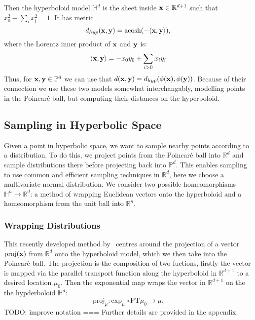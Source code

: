 \documentclass[11pt, twocolumn]{article}
\begin{document}
Then the hyperboloid model $\mathbb{H}^d$ is the sheet inside $\bold{x}\in\mathbb{R}^{d+1}$ such that $x_{0}^{2} - \sum_{i} x_{i}^{2} = 1$.
It has metric
\begin{equation}
    d_{hyp}(\bold{x}, \bold{y}) = \text{acosh}(-\langle \bold{x}, \bold{y} \rangle),
\end{equation}
where the Lorentz inner product of $\bold{x}$ and $\bold{y}$ is:
\begin{equation*}
	\langle \bold{x}, \bold{y} \rangle = -x_{0}y_{0} + \sum_{i>0} x_{i}y_{i}
\end{equation*}
Thus, for $\bold{x}, \bold{y} \in \mathbb{P}^{d}$ we can use that $d(\bold{x}, \bold{y}) = d_{hyp}(\phi(\bold{x}), \phi(\bold{y}))$.
Because of their connection we use these two models somewhat interchangably, modelling points in the Poincaré ball, but computing their distances on the hyperboloid.

\subsection{Sampling in Hyperbolic Space}
Given a point in hyperbolic space, we want to sample nearby points according to a distribution.
To do this, we project points from the Poincaré ball into $\mathbb{R}^d$ and sample distributions there before projecting back into $\mathbb{P}^d$.
This enables sampling to use common and efficient sampling techniques in $\mathbb{R}^d$, here we choose a multivariate normal distribution.
We consider two possible homeomorphisms $\mathbb{H}^n \to \mathbb{R}^d$: a method of wrapping Euclidean vectors onto the hyperboloid and a homeomorphism from the unit ball into $\mathbb{R}^n$.

\subsubsection{Wrapping Distributions}
This recently developed method by~\cite{nagano2019wrapped} centres around the projection of a vector $\text{proj}(\bold{x})$ from $\mathbb{R}^d$ onto the hyperboloid model, which we then take into the Poincaré ball.
The projection is the composition of two fuctions, firstly the vector is mapped via the parallel transport function along the hyperboloid in $\mathbb{R}^{d+1}$ to a desired location $\mu_0$.
Then the exponential map wraps the vector in $\mathbb{R}^{d+1}$ on the the hypderboloid $\mathbb{H}^d$:
\begin{equation}
    \text{proj}_{\mu}: \text{exp}_{\mu} \circ \text{PT}{\mu_{0} \to \mu}.
\end{equation}
TODO: improve notation ===
Further details are provided in the appendix.
\end{document}
